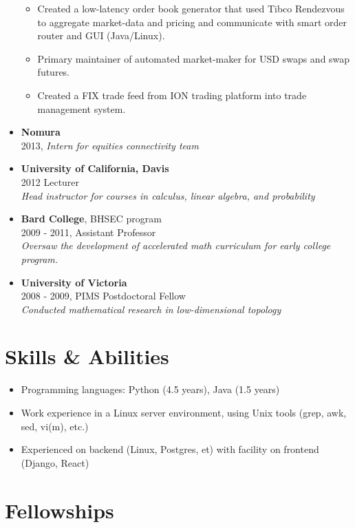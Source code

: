 \documentclass[margin]{res}
\def\tightlist{}
\begin{document}
\begin{resume}
\begin{itemize}
  \begin{itemize}
  \tightlist
  \item
    Created a low-latency order book generator that used Tibco
    Rendezvous to aggregate market-data and pricing and communicate with
    smart order router and GUI (Java/Linux).
  \item
    Primary maintainer of automated market-maker for USD swaps and swap
    futures.
  \item
    Created a FIX trade feed from ION trading platform into trade
    management system.
  \end{itemize}
\item
  \textbf{Nomura}\\
  2013, \emph{Intern for equities connectivity team}
\item
  \textbf{University of California, Davis}\\
  2012 Lecturer\\
  \emph{Head instructor for courses in calculus, linear algebra, and
  probability}
\item
  \textbf{Bard College}, BHSEC program\\
  2009 - 2011, Assistant Professor\\
  \emph{Oversaw the development of accelerated math curriculum for early
  college program.}
\item
  \textbf{University of Victoria}\\
  2008 - 2009, PIMS Postdoctoral Fellow\\
  \emph{Conducted mathematical research in low-dimensional topology}
\end{itemize}

\hypertarget{skills-abilities}{%
\section{Skills \& Abilities}\label{skills-abilities}}

\begin{itemize}
\tightlist
\item
  Programming languages: {Python} (4.5 years), {Java} (1.5 years)
\item
  Work experience in a Linux server environment, using Unix tools (grep,
  awk, sed, vi(m), etc.)
\item
  Experienced on backend (Linux, Postgres, et) with facility on frontend
  (Django, React)
\end{itemize}

\hypertarget{fellowships}{%
\section{Fellowships}\label{fellowships}}


\end{resume}
\end{document}
